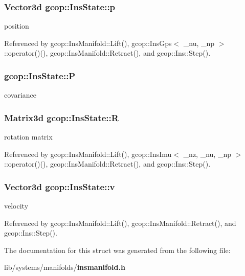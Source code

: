 \subsubsection[{p}]{\setlength{\rightskip}{0pt plus 5cm}\-Vector3d {\bf gcop\-::\-Ins\-State\-::p}}\label{structgcop_1_1InsState_ab0abfd2e8302e17f64c043aa23166348}


position 



\-Referenced by gcop\-::\-Ins\-Manifold\-::\-Lift(), gcop\-::\-Ins\-Gps$<$ \-\_\-nu, \-\_\-np $>$\-::operator()(), gcop\-::\-Ins\-Manifold\-::\-Retract(), and gcop\-::\-Ins\-::\-Step().

\subsubsection[{\-P}]{ {\bf gcop\-::\-Ins\-State\-::\-P}}\label{structgcop_1_1InsState_ac84fb92989ed951e7ca0b80db7c2408a}


covariance 

\subsubsection[{\-R}]{\setlength{\rightskip}{0pt plus 5cm}\-Matrix3d {\bf gcop\-::\-Ins\-State\-::\-R}}\label{structgcop_1_1InsState_a1c61bb72c5990935d44d918b08be5ab5}


rotation matrix 



\-Referenced by gcop\-::\-Ins\-Manifold\-::\-Lift(), gcop\-::\-Ins\-Imu$<$ \-\_\-nz, \-\_\-nu, \-\_\-np $>$\-::operator()(), gcop\-::\-Ins\-Manifold\-::\-Retract(), and gcop\-::\-Ins\-::\-Step().

\subsubsection[{v}]{\setlength{\rightskip}{0pt plus 5cm}\-Vector3d {\bf gcop\-::\-Ins\-State\-::v}}\label{structgcop_1_1InsState_adb2279cc8f72a5b7e74ef9629be8c58f}


velocity 



\-Referenced by gcop\-::\-Ins\-Manifold\-::\-Lift(), gcop\-::\-Ins\-Manifold\-::\-Retract(), and gcop\-::\-Ins\-::\-Step().



\-The documentation for this struct was generated from the following file\-:\begin{DoxyCompactItemize}
\item 
lib/systems/manifolds/{\bf insmanifold.\-h}\end{DoxyCompactItemize}
